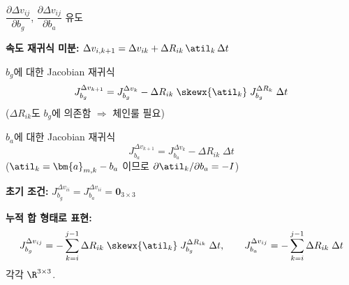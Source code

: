 \begin{frame}[shrink=10]{$\dfrac{\partial \Delta v_{ij}}{\partial b_g}$,\; $\dfrac{\partial \Delta v_{ij}}{\partial b_a}$ 유도}

  \textbf{속도 재귀식 미분:}
  $\Delta v_{i,k+1} = \Delta v_{ik} + \Delta R_{ik}\,\atil_k\,\Delta t$

  \pause
  \begin{block}{$b_g$에 대한 Jacobian 재귀식}
    \[
      J_{b_g}^{\Delta v_{k+1}}
      = J_{b_g}^{\Delta v_k}
        - \Delta R_{ik}\;\skewx{\atil_k}\;J_{b_g}^{\Delta R_k}\;\Delta t
    \]
    ($\Delta R_{ik}$도 $b_g$에 의존함 $\Rightarrow$ 체인룰 필요)
  \end{block}

  \pause
  \begin{block}{$b_a$에 대한 Jacobian 재귀식}
    \[
      J_{b_a}^{\Delta v_{k+1}}
      = J_{b_a}^{\Delta v_k}
        - \Delta R_{ik}\;\Delta t
    \]
    ($\atil_k = \bm{a}_{m,k} - b_a$ 이므로 $\partial\atil_k/\partial b_a = -I$)
  \end{block}

  \pause
  \textbf{초기 조건:} $J_{b_g}^{\Delta v_{ii}} = J_{b_a}^{\Delta v_{ii}} = \bm{0}_{3\times 3}$

  \pause
  \vspace{0.2em}
  \textbf{누적 합 형태로 표현:}
  \[
    J_{b_g}^{\Delta v_{ij}}
    = -\sum_{k=i}^{j-1}\Delta R_{ik}\;\skewx{\atil_k}\;J_{b_g}^{\Delta R_{ik}}\;\Delta t,
    \qquad
    J_{b_a}^{\Delta v_{ij}}
    = -\sum_{k=i}^{j-1}\Delta R_{ik}\;\Delta t
  \]
  각각 $\R^{3\times 3}$.
\end{frame}


